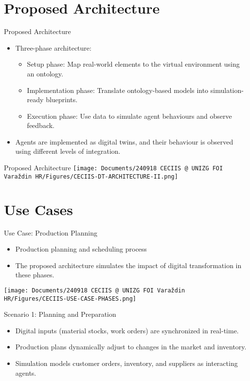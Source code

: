 \section{Proposed Architecture}

\begin{frame}{Proposed Architecture}
    \begin{itemize}
        \item Three-phase architecture:
        \begin{itemize}
            \item \alert{Setup phase}: Map real-world elements to the virtual environment using an ontology.
            \item \alert{Implementation phase}: Translate ontology-based models into simulation-ready blueprints.
            \item \alert{Execution phase}: Use data to simulate agent behaviours and observe feedback.
        \end{itemize}
        \item Agents are implemented as digital twins, and their behaviour is observed using different levels of integration.
    \end{itemize}
\end{frame}

\begin{frame}{Proposed Architecture}
    \centering
    \texttt{[image: Documents/240918 CECIIS @ UNIZG FOI Varaždin HR/Figures/CECIIS-DT-ARCHITECTURE-II.png]}
\end{frame}

\section{Use Cases}

\begin{frame}{Use Case: Production Planning}
    \begin{itemize}
        \item Production planning and scheduling process
        \item The proposed architecture simulates the impact of digital transformation in these phases.
    \end{itemize}

    \centering
    \texttt{[image: Documents/240918 CECIIS @ UNIZG FOI Varaždin HR/Figures/CECIIS-USE-CASE-PHASES.png]}
\end{frame}

\begin{frame}{Scenario 1: Planning and Preparation}
    \begin{itemize}
        \item Digital inputs (material stocks, work orders) are synchronized in real-time.
        \item Production plans dynamically adjust to changes in the market and inventory.
        \item Simulation models customer orders, inventory, and suppliers as interacting agents.
    \end{itemize}
\end{frame}

